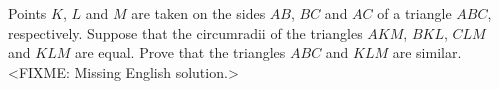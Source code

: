 \problem
Points $K$, $L$ and $M$ are taken on the sides $AB$, $BC$ and $AC$ of a
triangle $ABC$, respectively.
Suppose that the circumradii of the triangles $AKM$, $BKL$, $CLM$ and $KLM$ are
equal.
Prove that the triangles $ABC$ and $KLM$ are similar.
\solution
<FIXME: Missing English solution.>
\endproblem
